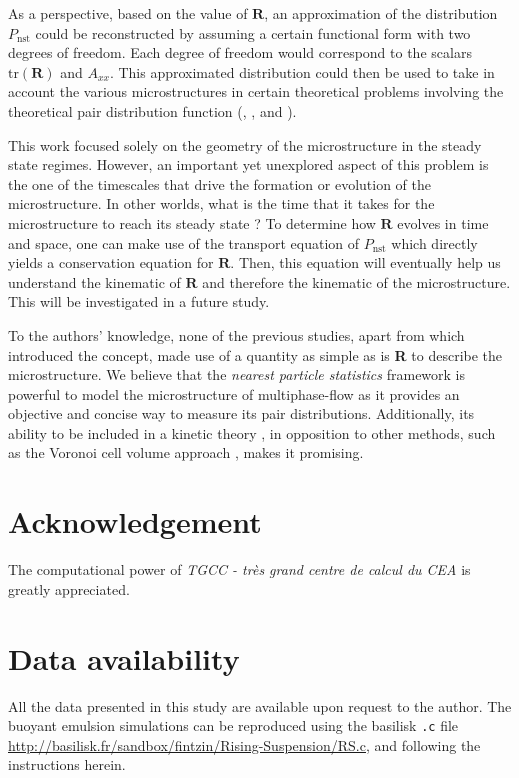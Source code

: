 As a perspective, based on the value of $\textbf{R}$, an approximation of the distribution $P_\text{nst}$ could be reconstructed by assuming a certain functional form with two degrees of freedom.
Each degree of freedom would correspond to the scalars $\text{tr}(\textbf{R})$ and $A_{xx}$.
This approximated distribution could then be used to take in account the various microstructures in certain theoretical problems involving the theoretical pair distribution function (\citet{batchelor1972sedimentation}, \citet{hinch1977averaged,wang1999longitudinal}, and \citet{zhang2021ensemble}).

This work focused solely on the geometry of the microstructure in the steady state regimes. 
However, an important yet unexplored aspect of this problem is the one of the timescales that drive the formation or evolution of the microstructure. 
In other worlds, what is the time that it takes for the microstructure to reach its steady state ? 
To determine how $\textbf{R}$ evolves in time and space, one can make use of the transport equation of $P_\text{nst}$ which directly yields a conservation equation for $\textbf{R}$. 
Then, this equation will eventually help us understand the kinematic of $\textbf{R}$ and therefore the kinematic of the microstructure. 
This will be investigated in a future study. 


To the authors' knowledge, none of the previous studies, apart from \citet{zhang2023evolution} which introduced the concept, made use of a quantity as simple as is \textbf{R} to describe the microstructure. 
We believe that the \textit{nearest particle statistics} framework is powerful to model the microstructure of multiphase-flow as it provides an objective and concise way to measure its pair distributions. 
Additionally, its ability to be included in a kinetic theory \citep{zhang2023evolution}, in opposition to other methods,  such as the Voronoi cell volume approach \citep{senthil2005voronoi}, makes it promising. 

\section*{Acknowledgement}

The computational power of  \textit{TGCC - tr\`es grand centre de calcul du CEA} is greatly appreciated. 
\section*{Data availability}

All the data presented in this study are available upon request to the author. 
The buoyant emulsion simulations can be reproduced using the basilisk \texttt{.c} file \url{http://basilisk.fr/sandbox/fintzin/Rising-Suspension/RS.c}, and following the instructions herein. 

